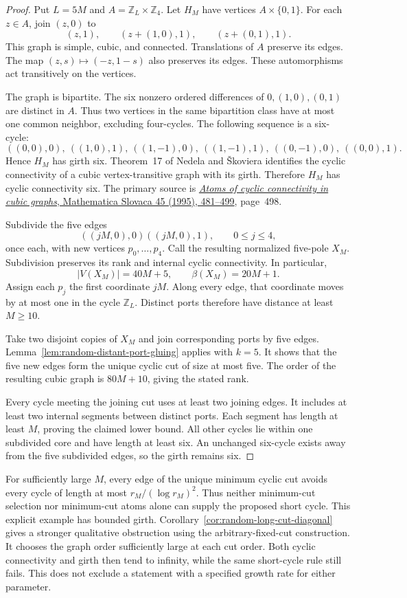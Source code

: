 \begin{proof}
Put $L=5M$ and $A=\mathbb Z_L\times\mathbb Z_4$.
Let $H_M$ have vertices $A\times\{0,1\}$.
For each $z\in A$, join $(z,0)$ to
\[
 (z,1),\qquad (z+(1,0),1),\qquad (z+(0,1),1).
\]
This graph is simple, cubic, and connected.
Translations of $A$ preserve its edges.
The map $(z,s)\mapsto(-z,1-s)$ also preserves its edges.
These automorphisms act transitively on the vertices.

The graph is bipartite.
The six nonzero ordered differences of $0,(1,0),(0,1)$ are distinct in $A$.
Thus two vertices in the same bipartition class have at most one common neighbor, excluding four-cycles.
The following sequence is a six-cycle:
\[
 ((0,0),0),\ ((1,0),1),\ ((1,-1),0),\
 ((1,-1),1),\ ((0,-1),0),\ ((0,0),1).
\]
Hence $H_M$ has girth six.
Theorem~17 of Nedela and \v{S}koviera identifies the cyclic connectivity of a cubic vertex-transitive graph with its girth.
Therefore $H_M$ has cyclic connectivity six.
The primary source is
\href{https://dml.cz/bitstream/handle/10338.dmlcz/132921/MathSlov_45-1995-5_3.pdf}{\emph{Atoms of cyclic connectivity in cubic graphs}, Mathematica Slovaca 45 (1995), 481--499}, page~498.

Subdivide the five edges
\[
 ((jM,0),0)((jM,0),1),\qquad 0\le j\le4,
\]
once each, with new vertices $p_0,\ldots,p_4$.
Call the resulting normalized five-pole $X_M$.
Subdivision preserves its rank and internal cyclic connectivity.
In particular,
\[
 |V(X_M)|=40M+5,\qquad \beta(X_M)=20M+1.
\]
Assign each $p_j$ the first coordinate $jM$.
Along every edge, that coordinate moves by at most one in the cycle $\mathbb Z_L$.
Distinct ports therefore have distance at least $M\ge10$.

Take two disjoint copies of $X_M$ and join corresponding ports by five edges.
Lemma~\ref{lem:random-distant-port-gluing} applies with $k=5$.
It shows that the five new edges form the unique cyclic cut of size at most five.
The order of the resulting cubic graph is $80M+10$, giving the stated rank.

Every cycle meeting the joining cut uses at least two joining edges.
It includes at least two internal segments between distinct ports.
Each segment has length at least $M$, proving the claimed lower bound.
All other cycles lie within one subdivided core and have length at least six.
An unchanged six-cycle exists away from the five subdivided edges, so the girth remains six.
\end{proof}

For sufficiently large $M$, every edge of the unique minimum cyclic cut avoids every cycle of length at most $r_M/(\log r_M)^2$.
Thus neither minimum-cut selection nor minimum-cut atoms alone can supply the proposed short cycle.
This explicit example has bounded girth.
Corollary~\ref{cor:random-long-cut-diagonal} gives a stronger qualitative obstruction using the arbitrary-fixed-cut construction.
It chooses the graph order sufficiently large at each cut order.
Both cyclic connectivity and girth then tend to infinity, while the same short-cycle rule still fails.
This does not exclude a statement with a specified growth rate for either parameter.

